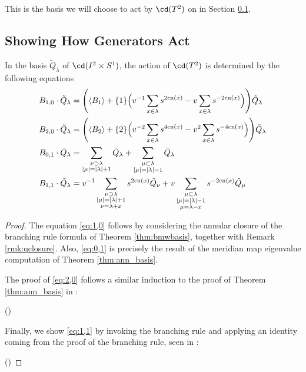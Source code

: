This is the basis we will choose to act by $\cd(T^2)$ on in Section \ref{sec:action}. 


\subsection{Showing How Generators Act} \label{sec:action}


\begin{proposition} \label{prop:generatoractions}
In the basis $\tilde{Q}_\lambda$ of $\cd(I^2 \times S^1)$, the action of $\cd(T^2)$ is determined by the following equations
\begin{align}
    B_{1,0} \cdot \tilde{Q}_\lambda &= \Bigg(\langle B_1 \rangle + \{1\} \Big( v^{-1}\sum_{x\in\lambda} s^{2\mathrm{cn}(x)} - v \sum_{x\in\lambda} s^{-2\mathrm{cn}(x)} \Big) \Bigg) \tilde{Q}_\lambda \label{eq:1,0}\\
    B_{2,0} \cdot \tilde{Q}_\lambda &= \Bigg(\langle B_2 \rangle + \{2\} \Big( v^{-2}\sum_{x\in\lambda} s^{4\mathrm{cn}(x)} - v^2 \sum_{x\in\lambda} s^{-4\mathrm{cn}(x)} \Big) \Bigg) \tilde{Q}_\lambda \label{eq:2,0}\\
    B_{0,1} \cdot \tilde{Q}_\lambda &= \sum_{\substack{\nu \supset \lambda \\ |\mu| = |\lambda| + 1}} \tilde{Q}_\lambda + \sum_{\substack{\mu \subset \lambda \\ |\mu| = |\lambda| - 1}} \tilde{Q}_\lambda \label{eq:0,1}\\
    B_{1,1} \cdot \tilde{Q}_\lambda &= v^{-1} \sum_{\substack{\nu \supset \lambda \\ |\mu| = |\lambda| + 1 \\ \nu = \lambda + x}} s^{2\mathrm{cn}(x)} \tilde{Q}_\nu + v \sum_{\substack{\mu \subset \lambda \\ |\mu| = |\lambda| - 1 \\ \mu = \lambda - x}} s^{-2\mathrm{cn}(x)} \tilde{Q}_\mu \label{eq:1,1}
\end{align}
\end{proposition}
\begin{proof}
The equation \eqref{eq:1,0} follows by considering the annular closure of the branching rule formula of Theorem \ref{thm:bmwbasis}, together with Remark \ref{rmk:qclosure}. 
Also, \eqref{eq:0,1} is precisely the result of the meridian map eigenvalue computation of Theorem \ref{thm:ann_basis}. 

The proof of \eqref{eq:2,0} follows a similar induction to the proof of Theorem \ref{thm:ann_basis} in \cite{ZL01}:

()

Finally, we show \eqref{eq:1,1} by invoking the branching rule and applying an identity coming from the proof of the branching rule, seen in \cite{BB01}:

()
\end{proof}










